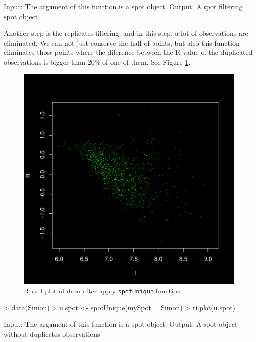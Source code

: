 \documentclass[12pt]{article}
\begin{document}
\begin{Soutput}
Input: The argument of this function is a spot object.
Output: A spot filtering spot object
\end{Soutput}

Another step is the replicates filtering, and in this step, a lot of observations are eliminated. We can not just conserve the half of points, but also this function eliminates those points where the diference between the R value of the duplicated observations is bigger than 20\% of one of them. See Figure \ref{fig11}.\\
\begin{figure}[h]
\begin{center}
\includegraphics{example-genArise-013}
\caption{R vs I plot of data after apply \texttt{spotUnique} function. \label{fig11}}
\end{center}
\end{figure}
\begin{Scode}
> data(Simon)
> u.spot <- spotUnique(mySpot = Simon)
> ri.plot(u.spot)
\end{Scode}

\begin{Soutput}
Input: The argument of this function is a spot object.
Output: A spot object without duplicates observations
\end{Soutput}
\end{document}
